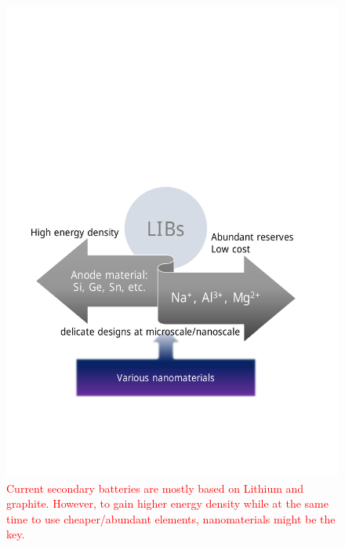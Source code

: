 \begin{figure}  
\centering
\includegraphics[width=340pt]{figures/figure1_lib.pdf}
\caption[Future of secondary ion batteries]{\textcolor{red}{Current secondary batteries are mostly based on Lithium and graphite. However, to gain higher energy density while at the same time to use cheaper/abundant elements, nanomaterials might be the key. }
\label{fig:1lib}}
\end{figure}

